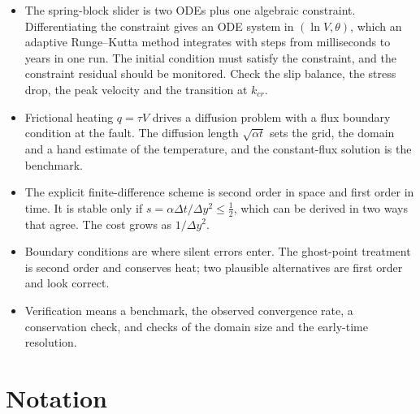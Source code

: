 \begin{itemize}[itemsep=2pt,topsep=2pt]
\item The spring-block slider is two ODEs plus one algebraic constraint. Differentiating the constraint gives an ODE system in $(\ln V,\theta)$, which an adaptive Runge--Kutta method integrates with steps from milliseconds to years in one run. The initial condition must satisfy the constraint, and the constraint residual should be monitored. Check the slip balance, the stress drop, the peak velocity and the transition at $k_{cr}$.
\item Frictional heating $q=\tau V$ drives a diffusion problem with a flux boundary condition at the fault. The diffusion length $\sqrt{\alpha t}$ sets the grid, the domain and a hand estimate of the temperature, and the constant-flux solution is the benchmark.
\item The explicit finite-difference scheme is second order in space and first order in time. It is stable only if $s=\alpha\Delta t/\Delta y^2\le\tfrac12$, which can be derived in two ways that agree. The cost grows as $1/\Delta y^2$.
\item Boundary conditions are where silent errors enter. The ghost-point treatment is second order and conserves heat; two plausible alternatives are first order and look correct.
\item Verification means a benchmark, the observed convergence rate, a conservation check, and checks of the domain size and the early-time resolution.
\end{itemize}

\section{Notation}
\label{sec:l3-notation}

